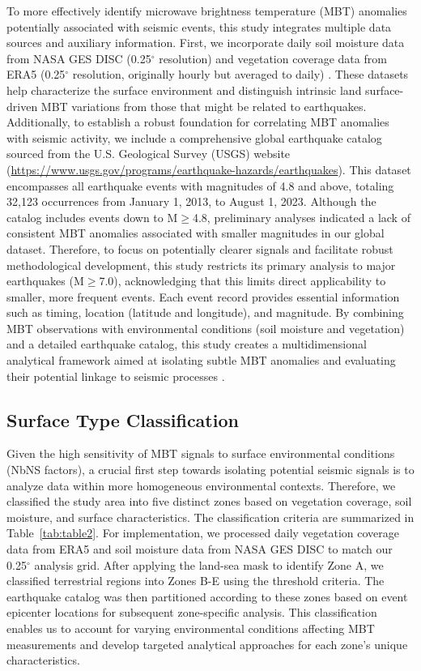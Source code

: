 \documentclass[fleqn,10pt]{wlscirep_mdpi_style}
\begin{document}
To more effectively identify microwave brightness temperature (MBT) anomalies potentially associated with seismic events, this study integrates multiple data sources and auxiliary information. First, we incorporate daily soil moisture data from NASA GES DISC (0.25$^{\circ}$ resolution)\cite{fangGlobalLandData2009} and vegetation coverage data from ERA5 (0.25$^{\circ}$ resolution, originally hourly but averaged to daily) \cite{hersbachERA5GlobalReanalysis2020,munoz-sabaterERA5landStateoftheartGlobal2021}. These datasets help characterize the surface environment and distinguish intrinsic land surface-driven MBT variations from those that might be related to earthquakes. Additionally, to establish a robust foundation for correlating MBT anomalies with seismic activity, we include a comprehensive global earthquake catalog sourced from the U.S. Geological Survey (USGS) website (\url{https://www.usgs.gov/programs/earthquake-hazards/earthquakes}). This dataset encompasses all earthquake events with magnitudes of 4.8 and above, totaling 32,123 occurrences from January 1, 2013, to August 1, 2023. Although the catalog includes events down to M$\ge$4.8, preliminary analyses indicated a lack of consistent MBT anomalies associated with smaller magnitudes in our global dataset. Therefore, to focus on potentially clearer signals and facilitate robust methodological development, this study restricts its primary analysis to major earthquakes (M$\ge$7.0), acknowledging that this limits direct applicability to smaller, more frequent events. Each event record provides essential information such as timing, location (latitude and longitude), and magnitude. By combining MBT observations with environmental conditions (soil moisture and vegetation) and a detailed earthquake catalog, this study creates a multidimensional analytical framework aimed at isolating subtle MBT anomalies and evaluating their potential linkage to seismic processes \cite{wuIdentifyingSeismicAnomalies2024,liuPreearthquakeMBTAnomalies2023}.

\subsection{Surface Type Classification}
Given the high sensitivity of MBT signals to surface environmental conditions (NbNS factors), a crucial first step towards isolating potential seismic signals is to analyze data within more homogeneous environmental contexts. Therefore, we classified the study area into five distinct zones based on vegetation coverage, soil moisture, and surface characteristics. The classification criteria are summarized in Table~\ref{tab:table2}. For implementation, we processed daily vegetation coverage data from ERA5 and soil moisture data from NASA GES DISC to match our 0.25$^{\circ}$ analysis grid. After applying the land-sea mask to identify Zone A, we classified terrestrial regions into Zones B-E using the threshold criteria. The earthquake catalog was then partitioned according to these zones based on event epicenter locations for subsequent zone-specific analysis. This classification enables us to account for varying environmental conditions affecting MBT measurements and develop targeted analytical approaches for each zone's unique characteristics.
\end{document}
